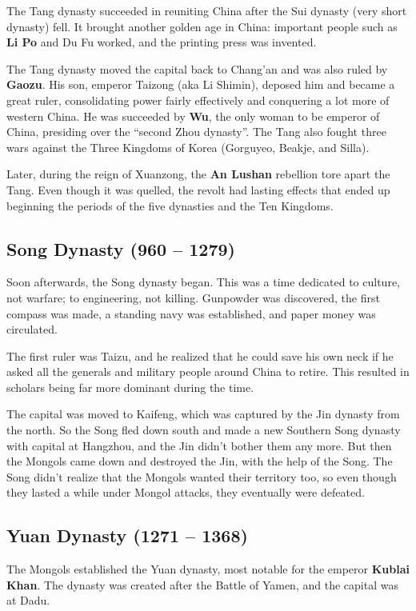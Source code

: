 The Tang dynasty succeeded in reuniting China after the Sui dynasty (very short dynasty) fell.
It brought another golden age in China:
important people such as \textbf{Li Po} and Du Fu worked,
and the printing press was invented.

The Tang dynasty moved the capital back to Chang'an and was also ruled by \textbf{Gaozu}.
His son, emperor Taizong (aka Li Shimin), deposed him and became a great ruler,
consolidating power fairly effectively and conquering a lot more of western China.
He was succeeded by \textbf{Wu}, the only woman to be emperor of China,
presiding over the ``second Zhou dynasty''.
The Tang also fought three wars against the Three Kingdoms of Korea (Gorguyeo, Beakje, and Silla).

Later, during the reign of Xuanzong, the \textbf{An Lushan} rebellion tore apart the Tang.
Even though it was quelled, the revolt had lasting effects that ended up beginning the
periods of the five dynasties and the Ten Kingdoms.

\subsection*{Song Dynasty (960 -- 1279)}

Soon afterwards, the Song dynasty began.
This was a time dedicated to culture, not warfare; to engineering, not killing.
Gunpowder was discovered, the first compass was made,
a standing navy was established, and paper money was circulated.

The first ruler was Taizu, and he realized that he could save his own neck if he
asked all the generals and military people around China to retire.
This resulted in scholars being far more dominant during the time.

The capital was moved to Kaifeng, which was captured by the Jin dynasty from the north.
So the Song fled down south and made a new Southern Song dynasty with capital at Hangzhou,
and the Jin didn't bother them any more.
But then the Mongols came down and destroyed the Jin, with the help of the Song.
The Song didn't realize that the Mongols wanted their territory too,
so even though they lasted a while under Mongol attacks, they eventually were defeated.

\subsection*{Yuan Dynasty (1271 -- 1368)}

The Mongols established the Yuan dynasty, most notable for the emperor \textbf{Kublai Khan}.
The dynasty was created after the Battle of Yamen, and the capital was at Dadu.

